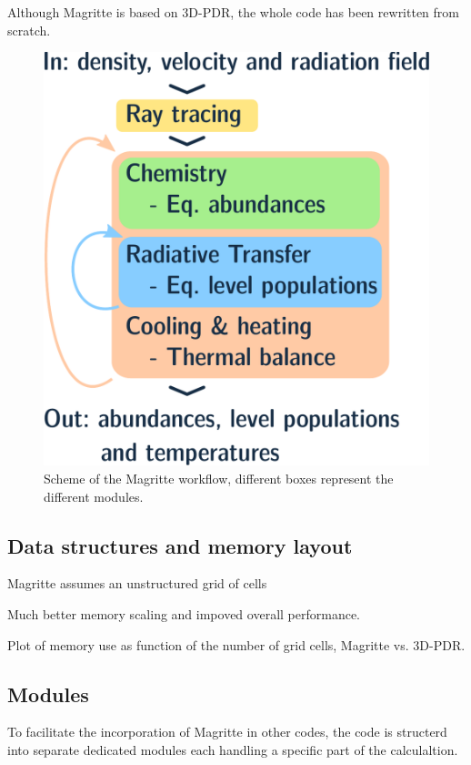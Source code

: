 \documentclass[a4paper,fleqn,usenatbib]{mnras}
\begin{document}
Although Magritte is based on 3D-PDR, the whole code has been rewritten from scratch.


\begin{figure}
	\includegraphics[width=\columnwidth]{figures/scheme.pdf}
  \caption{Scheme of the Magritte workflow, different boxes represent the different modules.}
  \label{scheme}
\end{figure}



\subsection{Data structures and memory layout}

Magritte assumes an unstructured grid of cells


Much better memory scaling and impoved overall performance.

Plot of memory use as function of the number of grid cells, Magritte vs. 3D-PDR.


\subsection{Modules}

To facilitate the incorporation of Magritte in other codes, the code is structerd into separate dedicated modules each handling a specific part of the calculaltion.
\end{document}
